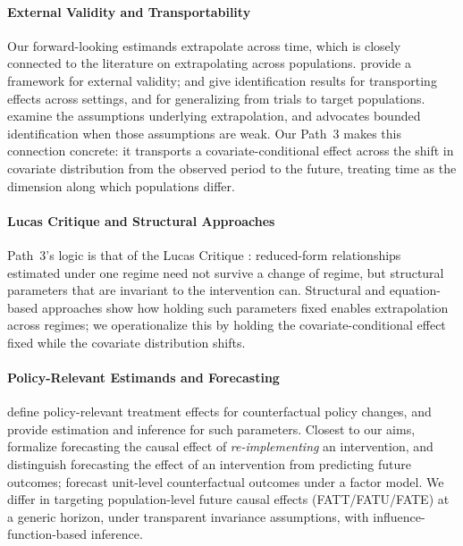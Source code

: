 \documentclass{article}
\begin{document}
\paragraph{External Validity and Transportability}

Our forward-looking estimands extrapolate across time, which is closely connected to the literature on extrapolating across populations. \citet{egamiElementsExternalValidity2023} provide a framework for external validity; \citet{pearlExternalValidityCalculus2022} and \citet{bareinboimTransportabilityCausalEffects2012} give identification results for transporting effects across settings, and \citet{coleGeneralizingEvidenceRandomized2010,tiptonImprovingGeneralizationsExperiments2013} for generalizing from trials to target populations. \citet{khosrowiExtrapolationCausalEffects2019,khosrowiExtrapolatingExperimentsConfidently2023} examine the assumptions underlying extrapolation, and \citet{manskiPublicPolicyUncertain2013} advocates bounded identification when those assumptions are weak. Our Path~3 makes this connection concrete: it transports a covariate-conditional effect across the shift in covariate distribution from the observed period to the future, treating time as the dimension along which populations differ.

\paragraph{Lucas Critique and Structural Approaches}

Path~3's logic is that of the Lucas Critique \citep{lucasjrEconometricPolicyEvaluation1976,ericssonExogeneityCointegrationEconomic1998,estrellaAreDeepParameters1999}: reduced-form relationships estimated under one regime need not survive a change of regime, but structural parameters that are invariant to the intervention can. Structural and equation-based approaches \citep{heckmanStructuralEquationsTreatment2005,pearlExternalValidityCalculus2022} show how holding such parameters fixed enables extrapolation across regimes; we operationalize this by holding the covariate-conditional effect fixed while the covariate distribution shifts.

\paragraph{Policy-Relevant Estimands and Forecasting}

\citet{heckmanPolicyRelevantTreatmentEffects2001} define policy-relevant treatment effects for counterfactual policy changes, and \citet{sasakiEstimationInferencePolicy2023} provide estimation and inference for such parameters. Closest to our aims, \citet{forastiereForecastingCausalEffects2025} formalize forecasting the causal effect of \emph{re-implementing} an intervention, and \citet{gischeForecastingCausalEffects2021} distinguish forecasting the effect of an intervention from predicting future outcomes; \citet{debCounterfactualForecastingPanel2026} forecast unit-level counterfactual outcomes under a factor model. We differ in targeting population-level future causal effects (FATT/FATU/FATE) at a generic horizon, under transparent invariance assumptions, with influence-function-based inference.
\end{document}

